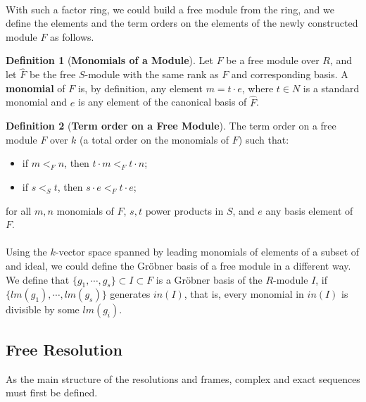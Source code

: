 \documentclass{article}
\theoremstyle{definition}
\newtheorem{definition}{Definition}[section]
\theoremstyle{remark}
\theoremstyle{example}
\begin{document}
\paragraph{}

With such a factor ring, we could build a free module from the ring, and we define the elements and the term orders on the elements of the newly constructed module $F$ as follows.

\begin{definition}[\textbf{Monomials of a Module}]
    Let $F$ be a free module over $R$, and let $\hat{F}$ be the free $S$-module with the same rank as $F$ and corresponding basis. A \textbf{monomial} of $F$ is, by definition, any element $m = t \cdot e$, where $t \in N$ is a standard monomial and $e$ is any element of the canonical basis of $\hat{F}$.
\end{definition}

\begin{definition}[\textbf{Term order on a Free Module}]
    The term order on a free module $F$ over $k$ (a total order on the monomials of $F$) such that:
    \begin{itemize}
        \item if $m <_F n$, then $t\cdot m <_F t \cdot n$;
        \item if $s <_S t$, then $s\cdot e <_F t \cdot e$;
    \end{itemize}
    for all $m, n$ monomials of $F$, $s,t$ power products in $S$, and $e$ any basis element of $F$.
\end{definition}

\paragraph{}

Using the $k$-vector space spanned by leading monomials of elements of a subset of and ideal, we could define the Gröbner basis of a free module in a different way. We define that $\{g_1, \cdots, g_s\} \subset I\subset F$ is a Gröbner basis of the $R$-module $I$, if $\{lm(g_1), \cdots, lm(g_s)\}$ generates $in(I)$, that is, every monomial in $in(I)$ is divisible by some $lm(g_i)$.

\subsection{Free Resolution}

As the main structure of the resolutions and frames, complex and exact sequences must first be defined.
\end{document}

